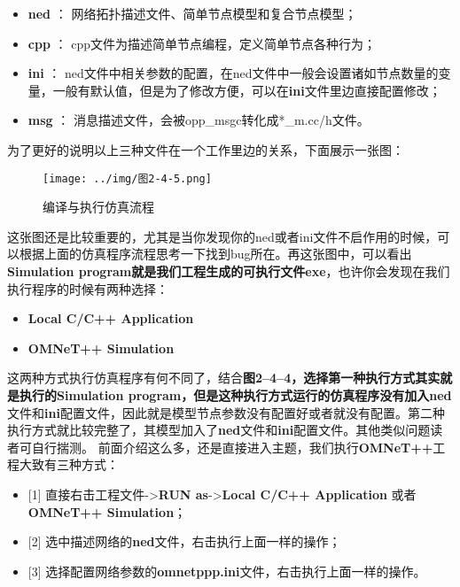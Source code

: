 \begin{itemize}
\item \textbf{ned} ： 网络拓扑描述文件、简单节点模型和复合节点模型；

\item \textbf{cpp} ： cpp文件为描述简单节点编程，定义简单节点各种行为；

\item \textbf{ini} ： ned文件中相关参数的配置，在ned文件中一般会设置诸如节点数量的变量，一般有默认值，但是为了修改方便，可以在\textbf{ini}文件里边直接配置修改；

\item \textbf{msg} ： 消息描述文件，会被opp\_msgc转化成*\_m.cc\slash h文件。

\end{itemize}

为了更好的说明以上三种文件在一个工作里边的关系，下面展示一张图：

\begin{figure}[htbp]
\centering
\texttt{[image: ../img/图2-4-5.png]}
\caption{编译与执行仿真流程}
\end{figure}

这张图还是比较重要的，尤其是当你发现你的ned或者ini文件不启作用的时候，可以根据上面的仿真程序流程思考一下找到bug所在。再这张图中，可以看出\textbf{Simulation program\textbf{就是我们工程生成的可执行文件}exe}，也许你会发现在我们执行程序的时候有两种选择：

\begin{itemize}
\item \textbf{Local C\slash C++ Application}

\item \textbf{OMNeT++ Simulation}

\end{itemize}

这两种方式执行仿真程序有何不同了，结合\textbf{图2--4--4\textbf{，选择第一种执行方式其实就是执行的}Simulation program\textbf{，但是这种执行方式运行的仿真程序没有加入}ned}文件和\textbf{ini}配置文件，因此就是模型节点参数没有配置好或者就没有配置。第二种执行方式就比较完整了，其模型加入了\textbf{ned}文件和\textbf{ini}配置文件。其他类似问题读者可自行揣测。
前面介绍这么多，还是直接进入主题，我们执行\textbf{OMNeT++}工程大致有三种方式：

\begin{itemize}
\item {[1]} 直接右击工程文件->\textbf{RUN as}->\textbf{Local C\slash C++ Application} 或者\textbf{OMNeT++ Simulation}；

\item {[2]} 选中描述网络的\textbf{ned}文件，右击执行上面一样的操作；

\item {[3]} 选择配置网络参数的\textbf{omnetppp.ini}文件，右击执行上面一样的操作。

\end{itemize}

